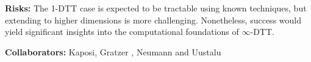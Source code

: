 \documentclass[a4paper,11pt]{article}
\renewcommand{\paragraph}[1]{\textbf{#1.}}
\begin{document}
\textbf{Risks:} The 1-DTT case is expected to be tractable using known
techniques, but extending to higher dimensions is more
challenging. Nonetheless, success would yield significant insights
into the computational foundations of $\infty$-DTT.

\textbf{Collaborators:} Kaposi, Gratzer , Neumann and Uustalu




  



  

\end{document}
